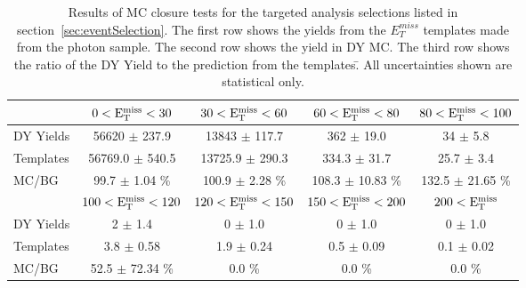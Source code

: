 \begin{table}[htb]
\scriptsize
\begin{center}
\caption{\label{table:targeted} Results of MC closure tests for the targeted analysis selections listed in section~\ref{sec:eventSelection}. The first row shows the yields from the $E^{miss}_T$ templates made from the photon sample. The second row shows the yield in DY MC. The third row shows the ratio of the DY Yield to the prediction from the templates.̄ All uncertainties shown are statistical only. }
\begin{tabular}{l|c|c|c|c}
\hline
\hline
          & $0 < \rm{E_{T}^{miss}} < 30$  & $30 < \rm{E_{T}^{miss}} < 60$  & $60 < \rm{E_{T}^{miss}} < 80$  & $80 < \rm{E_{T}^{miss}} < 100$  \\ 
\hline
DY Yields & 56620 $\pm$ 237.9 & 13843 $\pm$ 117.7 &   362 $\pm$ 19.0 &     34 $\pm$ 5.8 \\
Templates & 56769.0 $\pm$ 540.5 & 13725.9 $\pm$ 290.3 & 334.3 $\pm$ 31.7 &  25.7 $\pm$ 3.4 \\
    MC/BG & 99.7 $\pm$ 1.04 \% & 100.9 $\pm$ 2.28 \% & 108.3 $\pm$ 10.83 \% & 132.5 $\pm$ 21.65 \% \\
\hline
\hline
          & $100 < \rm{E_{T}^{miss}} < 120$  & $120 < \rm{E_{T}^{miss}} < 150$  & $150 < \rm{E_{T}^{miss}} < 200$  &    $200 < \rm{E_{T}^{miss}}$  \\ 
\hline
DY Yields &      2 $\pm$ 1.4 &      0 $\pm$ 1.0 &      0 $\pm$ 1.0 &      0 $\pm$ 1.0 \\
Templates &   3.8 $\pm$ 0.58 &   1.9 $\pm$ 0.24 &   0.5 $\pm$ 0.09 &   0.1 $\pm$ 0.02 \\
    MC/BG & 52.5 $\pm$ 72.34 \% & 0.0 \% & 0.0 \% & 0.0 \% \\
\hline
\hline
\end{tabular}
\end{center}
\end{table}

\clearpage
